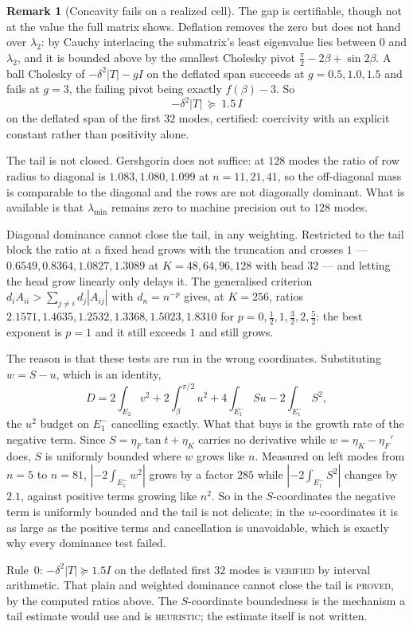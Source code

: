 \documentclass[11pt]{article}
\theoremstyle{definition}
\newtheorem{remark}[theorem]{Remark}
\begin{document}
\begin{remark}[Concavity fails on a realized cell]
The gap is certifiable, though not at the value the full matrix shows. Deflation removes the
zero but does not hand over $\lambda_2$: by Cauchy interlacing the submatrix's least
eigenvalue lies between $0$ and $\lambda_2$, and it is bounded above by the smallest Cholesky
pivot $\tfrac\pi2-2\beta+\sin2\beta$. A ball Cholesky of $-\delta^2|T|-gI$ on the deflated
span succeeds at $g=0.5,1.0,1.5$ and fails at $g=3$, the failing pivot being exactly
$f(\beta)-3$. So
\[
  -\delta^2|T|\ \succeq\ 1.5\,I
\]
on the deflated span of the first $32$ modes, certified: coercivity with an explicit
constant rather than positivity alone.

The tail is not closed. Gershgorin does not suffice: at $128$ modes the ratio of row radius
to diagonal is $1.083,1.080,1.099$ at $n=11,21,41$, so the off-diagonal mass is comparable
to the diagonal and the rows are not diagonally dominant. What is available is that
$\lambda_{\min}$ remains zero to machine precision out to $128$ modes.

Diagonal dominance cannot close the tail, in any weighting. Restricted to the tail block the
ratio at a fixed head grows with the truncation and crosses $1$ --- $0.6549,0.8364,1.0827,
1.3089$ at $K=48,64,96,128$ with head $32$ --- and letting the head grow linearly only
delays it. The generalised criterion $d_iA_{ii}>\sum_{j\ne i}d_j|A_{ij}|$ with $d_n=n^{-p}$
gives, at $K=256$, ratios $2.1571,1.4635,1.2532,1.3368,1.5023,1.8310$ for
$p=0,\tfrac12,1,\tfrac32,2,\tfrac52$: the best exponent is $p=1$ and it still exceeds $1$
and still grows.

The reason is that these tests are run in the wrong coordinates. Substituting $w=S-u$,
which is an identity,
\[
  D=2\!\int_{E_2}\!v^2+2\!\int_\beta^{\pi/2}\!u^2+4\!\int_{E_1^-}\!Su-2\!\int_{E_1^-}\!S^2 ,
\]
the $u^2$ budget on $E_1^-$ cancelling exactly. What that buys is the growth rate of the
negative term. Since $S=\eta_F\tan t+\eta_K$ carries no derivative while
$w=\eta_K-\eta_F'$ does, $S$ is uniformly bounded where $w$ grows like $n$. Measured on left
modes from $n=5$ to $n=81$, $|{-2}\int_{E_1^-}w^2|$ grows by a factor $285$ while
$|{-2}\int_{E_1^-}S^2|$ changes by $2.1$, against positive terms growing like $n^2$. So in
the $S$-coordinates the negative term is uniformly bounded and the tail is not delicate;
in the $w$-coordinates it is as large as the positive terms and cancellation is unavoidable,
which is exactly why every dominance test failed.

Rule~0: $-\delta^2|T|\succeq1.5I$ on the deflated first $32$ modes is \textsc{verified} by
interval arithmetic. That plain and weighted dominance cannot close the tail is
\textsc{proved}, by the computed ratios above. The $S$-coordinate boundedness is the
mechanism a tail estimate would use and is \textsc{heuristic}; the estimate itself is not
written.


\end{remark}
\end{document}
